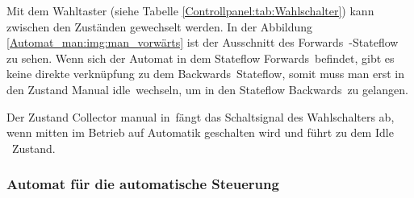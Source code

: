 Mit dem Wahltaster (siehe Tabelle \ref{Controllpanel:tab:Wahlschalter}) kann zwischen den Zuständen gewechselt werden. In der Abbildung \ref{Automat_man:img:man_vorwärts} ist der Ausschnitt des \frqq Forwards\flqq\ -Stateflow zu sehen. Wenn sich der Automat in dem Stateflow \frqq Forwards\flqq\ befindet, gibt es keine direkte verknüpfung zu dem \frqq Backwards\flqq\ Stateflow, somit muss man erst in den Zustand \frqq Manual idle\flqq\ wechseln, um in den Stateflow \frqq Backwards\flqq\ zu gelangen.

Der Zustand \frqq Collector manual in\flqq\ fängt  das Schaltsignal des Wahlschalters ab, wenn mitten im Betrieb auf Automatik geschalten wird und führt zu dem \frqq Idle \flqq\ Zustand.









\subsubsection{Automat für die automatische Steuerung}
\label{Automatensteuerung:Automat_auto}

